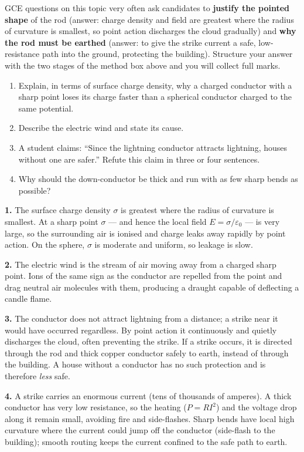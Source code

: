 \documentclass[11pt]{article}
\begin{document}
\begin{savaistu}
GCE questions on this topic very often ask candidates to \textbf{justify the pointed shape} of the rod (answer: charge density and field are greatest where the radius of curvature is smallest, so point action discharges the cloud gradually) and \textbf{why the rod must be earthed} (answer: to give the strike current a safe, low-resistance path into the ground, protecting the building). Structure your answer with the two stages of the method box above and you will collect full marks.
\end{savaistu}

\begin{exercice}
\begin{enumerate}
\item Explain, in terms of surface charge density, why a charged conductor with a sharp point loses its charge faster than a spherical conductor charged to the same potential.
\item Describe the electric wind and state its cause.
\item A student claims: ``Since the lightning conductor attracts lightning, houses without one are safer.'' Refute this claim in three or four sentences.
\item Why should the down-conductor be thick and run with as few sharp bends as possible?
\end{enumerate}
\end{exercice}

\begin{corrige}[Exercise 1]
\textbf{1.} The surface charge density $\sigma$ is greatest where the radius of curvature is smallest. At a sharp point $\sigma$ — and hence the local field $E=\sigma/\varepsilon_0$ — is very large, so the surrounding air is ionised and charge leaks away rapidly by point action. On the sphere, $\sigma$ is moderate and uniform, so leakage is slow.

\textbf{2.} The electric wind is the stream of air moving away from a charged sharp point. Ions of the same sign as the conductor are repelled from the point and drag neutral air molecules with them, producing a draught capable of deflecting a candle flame.

\textbf{3.} The conductor does not attract lightning from a distance; a strike near it would have occurred regardless. By point action it continuously and quietly discharges the cloud, often preventing the strike. If a strike occurs, it is directed through the rod and thick copper conductor safely to earth, instead of through the building. A house without a conductor has no such protection and is therefore \emph{less} safe.

\textbf{4.} A strike carries an enormous current (tens of thousands of amperes). A thick conductor has very low resistance, so the heating ($P = RI^2$) and the voltage drop along it remain small, avoiding fire and side-flashes. Sharp bends have local high curvature where the current could jump off the conductor (side-flash to the building); smooth routing keeps the current confined to the safe path to earth.
\end{corrige}
\end{document}
